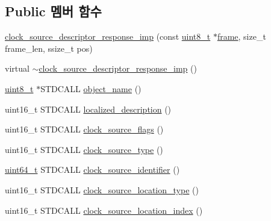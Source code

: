 \subsection*{Public 멤버 함수}
\begin{DoxyCompactItemize}
\item 
\hyperlink{classavdecc__lib_1_1clock__source__descriptor__response__imp_a762787b11b84a69cf348480545e5bf38}{clock\+\_\+source\+\_\+descriptor\+\_\+response\+\_\+imp} (const \hyperlink{stdint_8h_aba7bc1797add20fe3efdf37ced1182c5}{uint8\+\_\+t} $\ast$\hyperlink{gst__avb__playbin_8c_ac8e710e0b5e994c0545d75d69868c6f0}{frame}, size\+\_\+t frame\+\_\+len, ssize\+\_\+t pos)
\item 
virtual \hyperlink{classavdecc__lib_1_1clock__source__descriptor__response__imp_ad0d8164b73373750629178ffc11118dc}{$\sim$clock\+\_\+source\+\_\+descriptor\+\_\+response\+\_\+imp} ()
\item 
\hyperlink{stdint_8h_aba7bc1797add20fe3efdf37ced1182c5}{uint8\+\_\+t} $\ast$S\+T\+D\+C\+A\+LL \hyperlink{classavdecc__lib_1_1clock__source__descriptor__response__imp_a15837e3eb254ad44812cb766ae8cd53c}{object\+\_\+name} ()
\item 
uint16\+\_\+t S\+T\+D\+C\+A\+LL \hyperlink{classavdecc__lib_1_1clock__source__descriptor__response__imp_aa94307532fbb37e2f986fee8fec79373}{localized\+\_\+description} ()
\item 
uint16\+\_\+t S\+T\+D\+C\+A\+LL \hyperlink{classavdecc__lib_1_1clock__source__descriptor__response__imp_aeed4eefd9737d6ce75eb6740e13520e1}{clock\+\_\+source\+\_\+flags} ()
\item 
uint16\+\_\+t S\+T\+D\+C\+A\+LL \hyperlink{classavdecc__lib_1_1clock__source__descriptor__response__imp_a19f32d82cb876f44969b84e488c51365}{clock\+\_\+source\+\_\+type} ()
\item 
\hyperlink{parse_8c_aec6fcb673ff035718c238c8c9d544c47}{uint64\+\_\+t} S\+T\+D\+C\+A\+LL \hyperlink{classavdecc__lib_1_1clock__source__descriptor__response__imp_aa838b63fc709a7f7218d5318f07f3e51}{clock\+\_\+source\+\_\+identifier} ()
\item 
uint16\+\_\+t S\+T\+D\+C\+A\+LL \hyperlink{classavdecc__lib_1_1clock__source__descriptor__response__imp_aeb0b61b73e9719889a643f1f509e1c16}{clock\+\_\+source\+\_\+location\+\_\+type} ()
\item 
uint16\+\_\+t S\+T\+D\+C\+A\+LL \hyperlink{classavdecc__lib_1_1clock__source__descriptor__response__imp_a5e5ffc34d136958e91808614b618d806}{clock\+\_\+source\+\_\+location\+\_\+index} ()
\end{DoxyCompactItemize}
